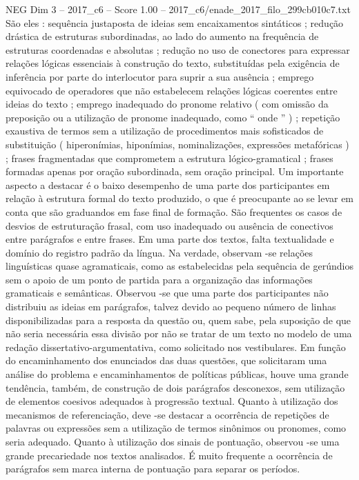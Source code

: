 \begin{textsample}{NEG Dim 3 – 2017\_c6 – Score 1.00 – 2017\_c6/enade\_2017\_filo\_299cb010c7.txt}
São eles : sequência justaposta de ideias sem encaixamentos sintáticos ; redução drástica de estruturas subordinadas, ao lado do aumento na frequência de estruturas coordenadas e absolutas ; redução no uso de conectores para expressar relações lógicas essenciais à construção do texto, substituídas pela exigência de inferência por parte do interlocutor para suprir a sua ausência ; emprego equivocado de operadores que não estabelecem relações lógicas coerentes entre ideias do texto ; emprego inadequado do pronome relativo ( com omissão da preposição ou a utilização de pronome inadequado, como “ onde ” ) ; repetição exaustiva de termos sem a utilização de procedimentos mais sofisticados de substituição ( hiperonímias, hiponímias, nominalizações, expressões metafóricas ) ; frases fragmentadas que comprometem a estrutura lógico-gramatical ; frases formadas apenas por oração subordinada, sem oração principal.
Um importante aspecto a destacar é o baixo desempenho de uma parte dos participantes em relação à estrutura formal do texto produzido, o que é preocupante ao se levar em conta que são graduandos em fase final de formação.
São frequentes os casos de desvios de estruturação frasal, com uso inadequado ou ausência de conectivos entre parágrafos e entre frases.
Em uma parte dos textos, falta textualidade e domínio do registro padrão da língua.
Na verdade, observam -se relações linguísticas quase agramaticais, como as estabelecidas pela sequência de gerúndios sem o apoio de um ponto de partida para a organização das informações gramaticais e semânticas.
Observou -se que uma parte dos participantes não distribuiu as ideias em parágrafos, talvez devido ao pequeno número de linhas disponibilizadas para a resposta da questão ou, quem sabe, pela suposição de que não seria necessária essa divisão por não se tratar de um texto no modelo de uma redação dissertativo-argumentativa, como solicitado nos vestibulares.
Em função do encaminhamento dos enunciados das duas questões, que solicitaram uma análise do problema e encaminhamentos de políticas públicas, houve uma grande tendência, também, de construção de dois parágrafos desconexos, sem utilização de elementos coesivos adequados à progressão textual.
Quanto à utilização dos mecanismos de referenciação, deve -se destacar a ocorrência de repetições de palavras ou expressões sem a utilização de termos sinônimos ou pronomes, como seria adequado.
Quanto à utilização dos sinais de pontuação, observou -se uma grande precariedade nos textos analisados.
É muito frequente a ocorrência de parágrafos sem marca interna de pontuação para separar os períodos.

\end{textsample}
